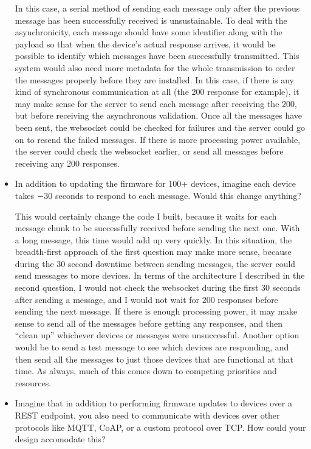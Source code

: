 \documentclass{article}
\begin{document}
\begin{itemize}
		In this case, a serial method of sending each message only after the previous message has been successfully received is unsustainable. To deal with the asynchronicity, each message should have some identifier along with the payload so that when the device's actual response arrives, it would be possible to identify which messages have been successfully transmitted. This system would also need more metadata for the whole transmission to order the messages properly before they are installed. In this case, if there is any kind of synchronous communication at all (the 200 response for example), it may make sense for the server to send each message after receiving the 200, but before receiving the asynchronous validation. Once all the messages have been sent, the websocket could be checked for failures and the server could go on to resend the failed messages. If there is more processing power available, the server could check the websocket earlier, or send all messages before receiving any 200 responses.
		
		\item In addition to updating the firmware for 100+ devices, imagine each
		device takes ∼30 seconds to respond to each message. Would this
		change anything?
		
		This would certainly change the code I built, because it waits for each message chunk to be successfully received before sending the next one. With a long message, this time would add up very quickly. In this situation, the breadth-first approach of the first question may make more sense, because during the 30 second downtime between sending messages, the server could send messages to more devices. In terms of the architecture I described in the second question, I would not check the websocket during the first 30 seconds after sending a message, and I would not wait for 200 responses before sending the next message. If there is enough processing power, it may make sense to send all of the messages before getting any responses, and then ``clean up'' whichever devices or messages were unsuccessful. Another option would be to send a test message to see which devices are responding, and then send all the messages to just those devices that are functional at that time. As always, much of this comes down to competing priorities and resources.
		
		\item Imagine that in addition to performing firmware updates to devices
		over a REST endpoint, you also need to communicate with devices
		over other protocols like MQTT, CoAP, or a custom protocol over
		TCP. How could your design accomodate this?
		

\end{itemize}
\end{document}
